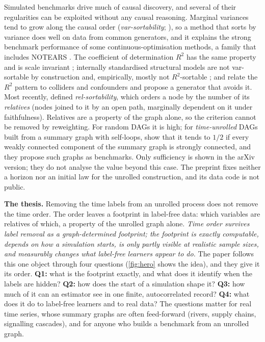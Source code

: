 \documentclass[pdflatex,sn-apa]{sn-jnl}
\theoremstyle{thmstyleone}
\theoremstyle{thmstylethree}
\theoremstyle{thmstyletwo}
\begin{document}
Simulated benchmarks drive much of causal discovery, and several of their
regularities can be exploited without any causal reasoning. Marginal variances
tend to grow along the causal order (\emph{var-sortability};
\citealp{reisach2021beware}), so a method that sorts by variance does well on
data from common generators, and it explains the strong benchmark performance of some
continuous-optimisation methods, a family that includes NOTEARS
\citep{zheng2018notears}. The
coefficient of determination $R^2$ has the same property and is scale
invariant \citep{reisach2023scale}; internally standardised structural
models are not var-sortable by construction and, empirically, mostly not
$R^2$-sortable \citep{ormaniec2025standardizing}; and \citet{herman2025unitless} relate the
$R^2$ pattern to colliders and confounders and propose a generator that avoids
it. Most recently, \citet{reisach2026topological} defined
\emph{rel-sortability}, which orders a node by the number of its
\emph{relatives} (nodes joined to it by an open path, marginally dependent on
it under faithfulness). Relatives are a property of the graph alone, so the
criterion cannot be removed by reweighting. For random DAGs it is high; for
\emph{time-unrolled} DAGs built from a summary graph with self-loops,
\citet[Thm.~4]{reisach2026topological} show that it tends to $1/2$ if every
weakly connected component of the summary graph is strongly connected, and
they propose such graphs as benchmarks. Only sufficiency is shown in the arXiv
version; they do not analyse the value beyond this case. The preprint fixes neither a horizon nor an initial law for the unrolled
construction, and its data code is not public.

\textbf{The thesis.} Removing the time labels from an unrolled process does not
remove the time order. The order leaves a footprint in label-free data: which
variables are relatives of which, a property of the unrolled graph alone.
\emph{Time order survives label removal as a graph-determined footprint; the
footprint is exactly computable, depends on how a simulation starts, is only
partly visible at realistic sample sizes, and measurably changes what
label-free learners appear to do.} The paper follows this one object through
four questions (\cref{fig:hero} shows the idea), and they give it its order.
\textbf{Q1:} what is the footprint exactly, and what does it identify when the
labels are hidden? \textbf{Q2:} how does the start of a simulation shape it?
\textbf{Q3:} how much of it can an estimator see in one finite, autocorrelated
record? \textbf{Q4:} what does it do to label-free learners and to real data?
The questions matter for real time series, whose summary graphs are often
feed-forward (rivers, supply chains, signalling cascades), and for anyone who
builds a benchmark from an unrolled graph.
\end{document}
